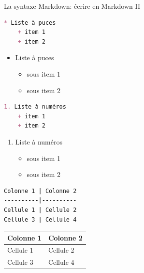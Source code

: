 \documentclass[10pt, xcolors={RGB}, hyperref={pdfpagelabels=false,
        colorlinks=true,
        linkcolor=black,
        urlcolor=black,
        citecolor=black,
        filecolor=black,
        menucolor=black,
        pdftex=true,
        bookmarks=true,
        bookmarksopen=true,
        hyperfootnotes=true}]{beamer}
\begin{document}
\begin{frame}[containsverbatim]{La syntaxe Markdown: écrire en Markdown II}
\vspace{-3ex}
\begin{multicols}{2}
\begin{lstlisting}[language=md, xleftmargin=9mm, xrightmargin=2mm, lineskip=0ex]
* Liste à puces
    + item 1
    + item 2
\end{lstlisting}
\vfill
\columnbreak
\vspace*{\fill}
\begin{itemize}
\item \tiny Liste à puces
    \begin{itemize}
        \item \tiny sous item 1
        \item \tiny sous item 2
    \end{itemize}
\end{itemize}
\end{multicols}

\begin{multicols}{2}
\begin{lstlisting}[language=md, xleftmargin=9mm, xrightmargin=2mm, lineskip=0ex]
1. Liste à numéros
    + item 1
    + item 2
\end{lstlisting}
\vfill
\columnbreak
\vspace*{\fill}
\begin{enumerate}
    \item \tiny Liste à numéros
    \begin{itemize}
        \item \tiny sous item 1
        \item \tiny sous item 2
    \end{itemize}
\end{enumerate}
\end{multicols}

\begin{multicols}{2}
\begin{lstlisting}[language=md, xleftmargin=9mm, xrightmargin=2mm, lineskip=0ex]
Colonne 1 | Colonne 2
----------|----------
Cellule 1 | Cellule 2
Cellule 3 | Cellule 4
\end{lstlisting}
\columnbreak
\vspace*{2ex}
{\tiny
\begin{tabular}{l|l}
    Colonne 1 & Colonne 2 \\
    \hline
    Cellule 1 & Cellule 2\\
    Cellule 3 & Cellule 4\\
\end{tabular}
}
\end{multicols}
\end{frame}
\end{document}
